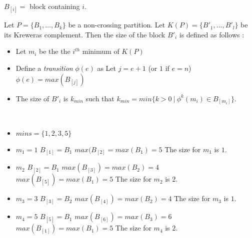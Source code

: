 \begin{notation}
    $B_{[i]} = $ block containing $i$.
\end{notation}

\begin{prop}
    Let $P = \{B_1, \ldots, B_k\}$ be a non-crossing partition.
    Let $K (P) = \{B'_1, \ldots, B'_l\}$ be its Kreweras complement.
    Then the size of the block $B'_i$ is defined as follows :
    \begin{itemize}
        \item Let $m_i$ be the the $i^{th}$ minimum of $K (P)$
        \item Define a \emph{transition} $\phi (e)$ as 
            \subitem Let $j = e + 1$ (or $1$ if $e = n$)
            \subitem $\phi(e) = max (B_{[j]})$
        \item The size of $B'_i$ is $k_{min}$ such that
        $k_{min} = min \{k > 0\ |\ \phi^k (m_i) \in B_{[m_i]}\}$.\\
    \end{itemize}
\end{prop}

\begin{example}[$P = \{\{1, 2, 5\}, \{3, 4\}, \{6\}\}$]
    ~\\
    \begin{itemize}
        \item $mins = \{1, 2, 3, 5\}$
        \item $m_1 = 1$
            \subitem $B_{[1]} = B_1$
            \subitem $max (B_{[2]} = max (B_1) = 5$
            \subitem The size for $m_1$ is $1$.
        \item $m_2$
            \subitem $B_{[2]} = B_1$
            \subitem $max (B_{[3]}) = max (B_2) = 4$
            \subitem $max (B_{[5]}) = max (B_1) = 5$
            \subitem The size for $m_2$ is $2$.
        \item $m_3 = 3$
            \subitem $B_{[3]} = B_2$
            \subitem $max (B_{[4]}) = max (B_2) = 4$
            \subitem The size for $m_3$ is $1$.
        \item $m_4 = 5$
            \subitem $B_{[5]} = B_1$
            \subitem $max (B_{[6]}) = max (B_3) = 6$
            \subitem $max (B_{[1]}) = max (B_1) = 5$
            \subitem The size for $m_4$ is $2$.
    \end{itemize}
\end{example}

